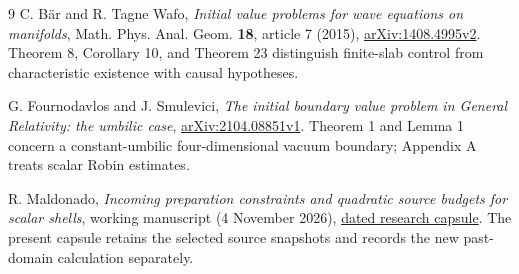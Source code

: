 \documentclass[11pt]{article}
\begin{document}
\begin{thebibliography}{9}
C. B\"ar and R. Tagne Wafo, \emph{Initial value problems for wave equations
on manifolds}, Math. Phys. Anal. Geom. \textbf{18}, article 7 (2015),
\href{https://arxiv.org/abs/1408.4995v2}{arXiv:1408.4995v2}.
Theorem 8, Corollary 10, and Theorem 23 distinguish finite-slab control
from characteristic existence with causal hypotheses.

G. Fournodavlos and J. Smulevici, \emph{The initial boundary value problem
in General Relativity: the umbilic case},
\href{https://arxiv.org/abs/2104.08851v1}{arXiv:2104.08851v1}.
Theorem 1 and Lemma 1 concern a constant-umbilic four-dimensional
vacuum boundary; Appendix A treats scalar Robin estimates.

R. Maldonado, \emph{Incoming preparation constraints and quadratic source
budgets for scalar shells}, working manuscript (4 November 2026),
\href{https://github.com/maldonado-research/HDblast/tree/main/research/HDBLAST_INCOMING_PREPARATION_LEDGER_20261104}{dated research capsule}.
The present capsule retains the selected source snapshots and records
the new past-domain calculation separately.
\end{thebibliography}
\end{document}
